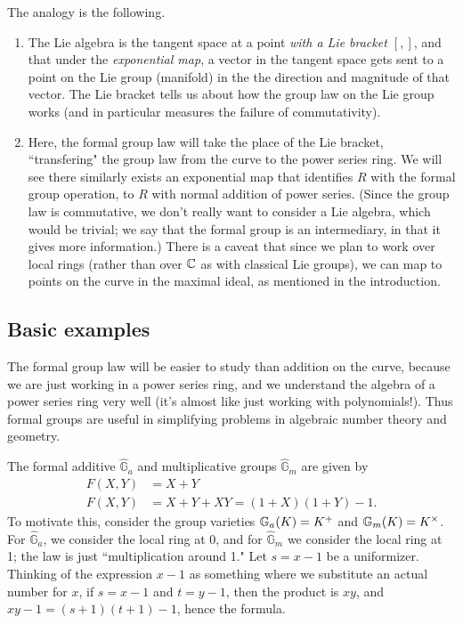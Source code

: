 The analogy is the following.
\begin{enumerate}
\item
The Lie algebra is the tangent space at a point {\it with a Lie bracket $[,]$}, and that under the {\it exponential map}, a vector in the tangent space gets sent to a point on the Lie group (manifold) in the the direction and magnitude of that vector. The Lie bracket tells us about how the group law on the Lie group works (and in particular measures the failure of commutativity).
\item
Here, the formal group law will take the place of the Lie bracket, ``transfering" the group law from the curve to the power series ring. We will see there similarly exists an exponential map that identifies $R$ with the formal group operation, to $R$ with normal addition of power series. (Since the group law is commutative, we don't really want to consider a Lie algebra, which would be trivial; we say that the formal group is an intermediary, in that it gives more information.) There is a caveat that since we plan to work over local rings (rather than over $\mathbb{C}$ as with classical Lie groups), we can map to points on the curve in the maximal ideal, as mentioned in the introduction.
\end{enumerate}
\subsection{Basic examples}

The formal group law will be easier to study than addition on the curve, because we are just working in a power series ring, and we understand the algebra of a power series ring very well (it's almost like just working with polynomials!). Thus formal groups are useful in simplifying problems in algebraic number theory and geometry.
\begin{ex}
The formal additive $\hat{\mathbb G}_a$ and multiplicative groups $\hat{\mathbb G}_m$ are given by
\begin{align*}
F(X,Y)&=X+Y\\
F(X,Y)&=X+Y+XY=(1+X)(1+Y)-1.
\end{align*}
To motivate this, consider the group varieties $\mathbb{G}_a(K)=K^+$ and $\mathbb{G}_m(K)=K^{\times}$. For $\hat{\mathbb G}_a$, we consider the local ring at 0, and for $\hat{\mathbb G}_m$ we consider the local ring at 1; the law is just ``multiplication around 1." Let $s=x-1$ be a uniformizer. Thinking of the expression $x-1$ as something where we substitute an actual number for $x$, if $s=x-1$ and $t=y-1$, then the product is $xy$, and $xy-1=(s+1)(t+1)-1$, hence the formula.
\end{ex}


